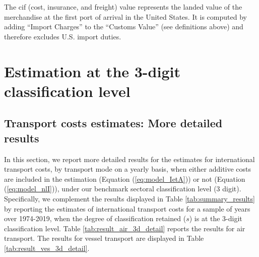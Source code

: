 \documentclass[a4paper,11pt]{article}
\begin{document}
The cif (cost, insurance, and freight) value represents the landed value of the merchandise at the first port of arrival in the United States.
It is computed by adding ``Import Charges'' to the ``Customs Value'' (see definitions above) and therefore excludes U.S.
import duties.

\clearpage
\setcounter{table}{0}
\setcounter{figure}{0}
\renewcommand{\thefigure}{B.\arabic{figure}}
\renewcommand{\thetable}{B.\arabic{table}}

\section{Estimation at the 3-digit classification level \label{app:more_results}}

\subsection{Transport costs estimates: More detailed results}

In this section, we report more detailed results for the estimates for international transport costs, by transport mode on a yearly basis, when either additive costs are included in the estimation (Equation (\ref{eq:model_IetA})) or not (Equation (\ref{eq:model_nlI})), under our benchmark sectoral classification level (3 digit).
Specifically, we complement the results displayed in Table \ref{tab:summary_results} by reporting the estimates of international transport costs for a sample of years over 1974-2019, when the degree of classification retained ($s$) is at the 3-digit classification level.
Table \ref{tab:result_air_3d_detail} reports the results for air transport.
The results for vessel transport are displayed in Table \ref{tab:result_ves_3d_detail}.
\end{document}
